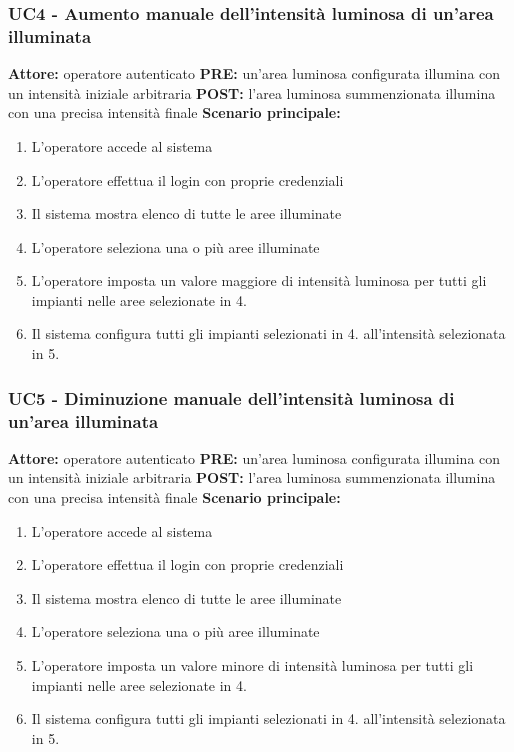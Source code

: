 \documentclass[a4paper, 12pt]{article}
\begin{document}
\subsubsection{UC4 - Aumento manuale dell'intensità luminosa di un'area illuminata}
\textbf{Attore:} operatore autenticato\newline
\textbf{PRE:} un'area luminosa configurata illumina con un intensità iniziale arbitraria\newline
\textbf{POST:} l'area luminosa summenzionata illumina con una precisa intensità finale\newline
\textbf{Scenario principale:}
\begin{enumerate}
    \item L'operatore accede al sistema
    \item L'operatore effettua il login con proprie credenziali
    \item Il sistema mostra elenco di tutte le aree illuminate
    \item L'operatore seleziona una o più aree illuminate
    \item L'operatore imposta un valore maggiore di intensità luminosa per tutti gli impianti nelle aree selezionate in 4.
    \item Il sistema configura tutti gli impianti selezionati in 4. all'intensità selezionata in 5.
\end{enumerate}

\subsubsection{UC5 - Diminuzione manuale dell'intensità luminosa di un'area illuminata}
\textbf{Attore:} operatore autenticato\newline
\textbf{PRE:} un'area luminosa configurata illumina con un intensità iniziale arbitraria\newline
\textbf{POST:} l'area luminosa summenzionata illumina con una precisa intensità finale\newline
\textbf{Scenario principale:}
\begin{enumerate}
    \item L'operatore accede al sistema
    \item L'operatore effettua il login con proprie credenziali
    \item Il sistema mostra elenco di tutte le aree illuminate
    \item L'operatore seleziona una o più aree illuminate
    \item L'operatore imposta un valore minore di intensità luminosa per tutti gli impianti nelle aree selezionate in 4.
    \item Il sistema configura tutti gli impianti selezionati in 4. all'intensità selezionata in 5.
\end{enumerate}
\end{document}
